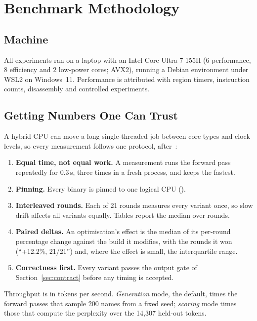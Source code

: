 \section{Benchmark Methodology}
\label{sec:method}

\subsection{Machine}
All experiments ran on a laptop with an Intel Core Ultra 7 155H (6 performance,
8 efficiency and 2 low-power cores; AVX2), running a Debian environment under
WSL2 on Windows~11. Performance is attributed with  region
timers, instruction counts, disassembly and controlled experiments.

\subsection{Getting Numbers One Can Trust}
A hybrid CPU can move a long single-threaded job between core types and clock
levels, so every measurement follows one protocol, after~\cite{georges2007rigorous,mytkowicz2009wrong}:

\begin{enumerate}
  \item \textbf{Equal time, not equal work.} A measurement runs the forward
        pass repeatedly for 0.3\,s, three times in a fresh process, and keeps
        the fastest.
  \item \textbf{Pinning.} Every binary is pinned to one logical CPU
        ().
  \item \textbf{Interleaved rounds.} Each of 21 rounds measures every variant
        once, so slow drift affects all variants equally. Tables report the
        median over rounds.
  \item \textbf{Paired deltas.} An optimisation's effect is the median of its
        per-round percentage change against the build it modifies, with the
        rounds it won (``+12.2\%, 21/21'') and, where the effect is small, the
        interquartile range.
  \item \textbf{Correctness first.} Every variant passes the output gate of
        Section~\ref{sec:contract} before any timing is accepted.
\end{enumerate}

Throughput is in tokens per second. \emph{Generation} mode, the default, times
the forward passes that sample 200 names from a fixed seed; \emph{scoring}
mode times those that compute the perplexity over the 14,307 held-out tokens.

